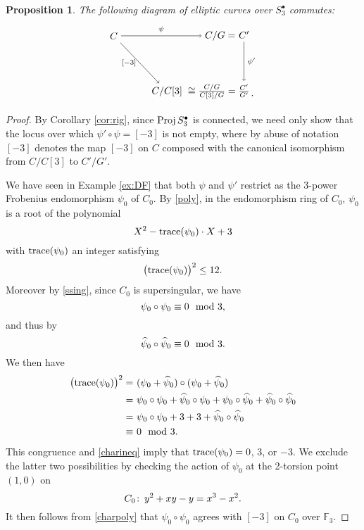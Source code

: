 \documentclass{gtpart}
\newtheorem{prop}[thm]{Proposition}
\theoremstyle{definition}
\theoremstyle{remark}
\def\co{\colon\thinspace}
\newcommand{\mb}[1]{\mathbb{#1}}
\newcommand{\Proj}{{\rm Proj\thinspace}}
\newcommand{\BF}{{\mb F}}
\newcommand{\Hpsi}{\widehat{\psi}}
\newcommand{\md}{~~{\rm mod}~}
\newcommand{\tr}{{\rm trace}}
\newcommand{\s}{S^\bullet}
\numberwithin{equation}{section}
\numberwithin{thm}{section}
\begin{document}
\begin{prop}
\label{prop:frob^2}
 The following diagram of elliptic curves over $\s_3$ commutes: 
 \begin{equation}
 \label{frob^2}
  \begin{tikzpicture}[baseline=(current bounding box.center)]
          \node (LT) at (0, 2) {$C$}; 
          \node (MT) at (3.8, 2) {$C/G = $}; 
          \node (RT) at (4.65, 2.04) {$C'$}; 
          \node (LB) at (1.9, 0) {$C/C[3]$}; 
          \node (MB) at (3.5, 0) {$\cong \frac{C/G}{C[3]/G} = $}; 
          \node (RB) at (4.65, 0.025) {$\frac{C'}{G'}$}; 
          \node at (4.95, -0.15) {.}; 
          \draw [->] (LT) -- node [above] {$\scriptstyle \psi$} (MT); 
          \draw [->] (LT) -- node [left] {$\scriptstyle [-3]$} (LB); 
          \draw [->] (RT) -- node [right] {$\scriptstyle \psi'$} (RB); 
  \end{tikzpicture}
 \end{equation}
\end{prop}
\begin{proof}
 By Corollary \ref{cor:rig}, since $\Proj \s_3$ is connected, we need 
 only show that the locus over which $\psi' \circ \psi = [-3]$ is not 
 empty, where by abuse of notation $[-3]$ denotes the map $[-3]$ on $C$ 
 composed with the canonical isomorphism from $C/C[3]$ to $C'/G'$.  

 We have seen in Example \ref{ex:DF} that both $\psi$ and $\psi'$ 
 restrict as the 3-power Frobenius endomorphism $\psi_0$ of $C_0$.  By 
 \eqref{poly}, in the endomorphism ring of $C_0$, $\psi_0$ is a root of 
 the polynomial 
 \begin{equation}
 \label{charpoly}
  X^2 - \tr(\psi_0) \cdot X + 3 
 \end{equation}
 with $\tr(\psi_0)$ an integer satisfying 
 \begin{equation}
 \label{charineq}
  \big( \tr(\psi_0) \big)^2 \leq 12.  
 \end{equation}
 Moreover by \eqref{ssing}, since $C_0$ is supersingular, we have 
 \[
  \psi_0 \circ \psi_0 \equiv 0 \md 3, 
 \]
 and thus by \cite[12.3.3(1)]{KM} 
 \[
  \Hpsi_0 \circ \Hpsi_0 \equiv 0 \md 3.  
 \]
 We then have 
 \begin{equation*}
 \begin{split}
  \big( \tr(\psi_0) \big)^2 = & ~ (\psi_0 + \Hpsi_0) \circ (\psi_0 + \Hpsi_0) \\
                            = & ~ \psi_0 \circ \psi_0 + \Hpsi_0 \circ \psi_0 + \psi_0 \circ \Hpsi_0 + \Hpsi_0 \circ \Hpsi_0 \\
                            = & ~ \psi_0 \circ \psi_0 + 3 + 3 + \Hpsi_0 \circ \Hpsi_0 \\
                       \equiv & ~ 0 \md 3.  
 \end{split}
 \end{equation*}
 This congruence and \eqref{charineq} imply that $\tr(\psi_0) = 0$, 3, 
 or $-3$.  We exclude the latter two possibilities by checking the 
 action of $\psi_0$ at the 2-torsion point $(1,0)$ on 
 \[
  C_0 \co y^2 + x y - y = x^3 - x^2.  
 \]
 It then follows from \eqref{charpoly} that $\psi_0 \circ \psi_0$ agrees 
 with $[-3]$ on $C_0$ over $\BF_3$.  
\end{proof}
\end{document}
